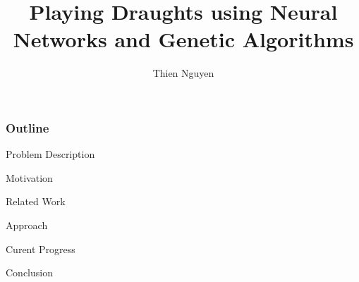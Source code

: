 \documentclass{beamer}
\begin{document}
    \title[NN and GA To Play Draughts] %
    {Playing Draughts using Neural Networks and Genetic Algorithms}
    \author[T. Nguyen] %
    {Thien Nguyen}
    \subject{Computer Science}

\frame{\titlepage}


\begin{frame}

  \frametitle{Outline}
    \begin{block}{Problem Description}
     \end{block}
    \begin{block}{Motivation}
    \end{block}
    \begin{block}{Related Work}
    \end{block}
    \begin{block}{Approach}
    \end{block}
    \begin{block}{Curent Progress}
    \end{block}
    \begin{block}{Conclusion}
    \end{block}
      
  
\end{frame}

\end{document}
